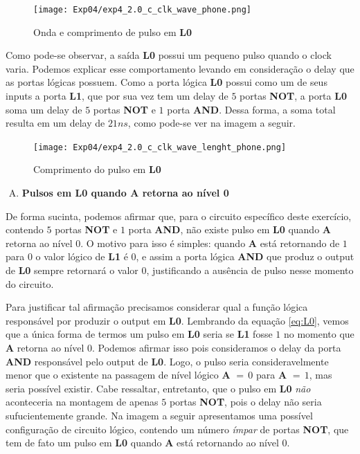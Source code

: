 \documentclass[12pt]{article}
\begin{document}
\begin{figure}[H]
    \centering
    \texttt{[image: Exp04/exp4\_2.0\_c\_clk\_wave\_phone.png]}
    \caption{Onda e comprimento de pulso em \textbf{L0}}\label{fig:exp4_2.0_c_clk_wave_phone.png}
\end{figure}

Como pode-se observar, a saída \textbf{L0} possui um pequeno pulso quando o
clock varia. Podemos explicar esse comportamento levando em consideração o delay
que as portas lógicas possuem. Como a porta lógica \textbf{L0} possui como um de
seus inputs a porta \textbf{L1}, que por sua vez tem um delay de $5$ portas
\textbf{NOT}, a porta \textbf{L0} soma um delay de $5$ portas \textbf{NOT} e $1$
porta \textbf{AND}. Dessa forma, a soma total resulta em um delay de $21ns$,
como pode-se ver na imagem a seguir.

\begin{figure}[H]
    \centering
    \texttt{[image: Exp04/exp4\_2.0\_c\_clk\_wave\_lenght\_phone.png]}
    \caption{Comprimento do pulso em \textbf{L0}}\label{fig:exp4_2.0_c_clk_wave_lenght_phone.png}
\end{figure}

\begin{enumerate}[D)]
\item \textbf{Pulsos em L0 quando A retorna ao nível 0}
\end{enumerate}

De forma sucinta, podemos afirmar que, para o circuito específico deste
exercício, contendo $5$ portas \textbf{NOT} e $1$ porta \textbf{AND}, não existe
pulso em \textbf{L0} quando \textbf{A} retorna ao nível $0$. O motivo para isso
é simples: quando \textbf{A} está retornando de $1$ para $0$ o valor lógico de
\textbf{L1} é $0$, e assim a porta lógica \textbf{AND} que produz o output de
\textbf{L0} sempre retornará o valor $0$, justificando a ausência de pulso nesse
momento do circuito.

Para justificar tal afirmação precisamos considerar qual a função lógica
responsável por produzir o output em \textbf{L0}. Lembrando da equação
\ref{eq:L0}, vemos que a única forma de termos um pulso em \textbf{L0} seria se
\textbf{L1} fosse $1$ no momento que \textbf{A} retorna ao nível $0$. Podemos
afirmar isso pois consideramos o delay da porta \textbf{AND} responsável pelo
output de \textbf{L0}. Logo, o pulso seria consideravelmente menor que o
existente na passagem de nível lógico \textbf{A} $= \, 0$ para \textbf{A}
$= \, 1$, mas seria possível existir. Cabe ressaltar, entretanto, que o pulso em
\textbf{L0} \emph{não} aconteceria na montagem de apenas $5$ portas
\textbf{NOT}, pois o delay não seria sufucientemente grande. Na imagem a seguir
apresentamos uma possível configuração de circuito lógico, contendo um número
\emph{ímpar} de portas \textbf{NOT}, que tem de fato um pulso em \textbf{L0}
quando \textbf{A} está retornando ao nível $0$.
\end{document}

